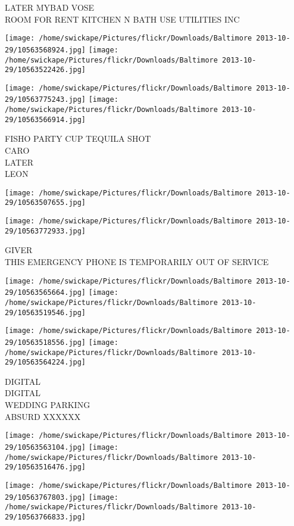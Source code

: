 \documentclass[10pt,letterpaper]{article}
\begin{document}
LATER MYBAD VOSE\\
ROOM FOR RENT KITCHEN N BATH USE UTILITIES INC
\pagebreak

\texttt{[image: /home/swickape/Pictures/flickr/Downloads/Baltimore 2013-10-29/10563568924.jpg]}
\texttt{[image: /home/swickape/Pictures/flickr/Downloads/Baltimore 2013-10-29/10563522426.jpg]}

\texttt{[image: /home/swickape/Pictures/flickr/Downloads/Baltimore 2013-10-29/10563775243.jpg]}
\texttt{[image: /home/swickape/Pictures/flickr/Downloads/Baltimore 2013-10-29/10563566914.jpg]}

FISHO PARTY CUP TEQUILA SHOT\\
CARO\\
LATER\\
LEON
\pagebreak

\texttt{[image: /home/swickape/Pictures/flickr/Downloads/Baltimore 2013-10-29/10563507655.jpg]}

\vspace{0.25in}
\texttt{[image: /home/swickape/Pictures/flickr/Downloads/Baltimore 2013-10-29/10563772933.jpg]}

GIVER\\
THIS EMERGENCY PHONE IS TEMPORARILY OUT OF SERVICE
\pagebreak

\texttt{[image: /home/swickape/Pictures/flickr/Downloads/Baltimore 2013-10-29/10563565664.jpg]}
\texttt{[image: /home/swickape/Pictures/flickr/Downloads/Baltimore 2013-10-29/10563519546.jpg]}

\texttt{[image: /home/swickape/Pictures/flickr/Downloads/Baltimore 2013-10-29/10563518556.jpg]}
\texttt{[image: /home/swickape/Pictures/flickr/Downloads/Baltimore 2013-10-29/10563564224.jpg]}

DIGITAL\\
DIGITAL\\
WEDDING PARKING\\
ABSURD XXXXXX
\pagebreak

\texttt{[image: /home/swickape/Pictures/flickr/Downloads/Baltimore 2013-10-29/10563563104.jpg]}
\texttt{[image: /home/swickape/Pictures/flickr/Downloads/Baltimore 2013-10-29/10563516476.jpg]}

\texttt{[image: /home/swickape/Pictures/flickr/Downloads/Baltimore 2013-10-29/10563767803.jpg]}
\texttt{[image: /home/swickape/Pictures/flickr/Downloads/Baltimore 2013-10-29/10563766833.jpg]}
\end{document}
